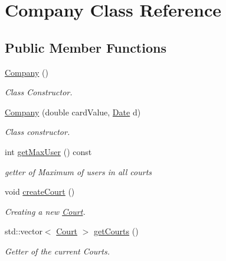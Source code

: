 \hypertarget{class_company}{}\section{Company Class Reference}
\label{class_company}
\subsection*{Public Member Functions}
\begin{DoxyCompactItemize}
\item 
\mbox{\label{class_company_a29937dda711b09df306ae7ca9b3d6b42}} 
\mbox{\hyperlink{class_company_a29937dda711b09df306ae7ca9b3d6b42}{Company}} ()
\begin{DoxyCompactList}\small\item\em Class Constructor. \end{DoxyCompactList}\item 
\mbox{\hyperlink{class_company_ac038a4c5e02f13a7bab9b5139990316e}{Company}} (double card\+Value, \mbox{\hyperlink{class_date}{Date}} d)
\begin{DoxyCompactList}\small\item\em Class constructor. \end{DoxyCompactList}\item 
int \mbox{\hyperlink{class_company_a837fd39a8f03c20a3ceb8617410956b7}{get\+Max\+User}} () const
\begin{DoxyCompactList}\small\item\em getter of Maximum of users in all courts \end{DoxyCompactList}\item 
\mbox{\label{class_company_a10770d690a59f9b4d9f84de6d0f527c9}} 
void \mbox{\hyperlink{class_company_a10770d690a59f9b4d9f84de6d0f527c9}{create\+Court}} ()
\begin{DoxyCompactList}\small\item\em Creating a new \mbox{\hyperlink{class_court}{Court}}. \end{DoxyCompactList}\item 
std\+::vector$<$ \mbox{\hyperlink{class_court}{Court}} $>$ \mbox{\hyperlink{class_company_afa0ab125a0ba718fe2c13802fe1703be}{get\+Courts}} ()
\begin{DoxyCompactList}\small\item\em Getter of the current Courts. \end{DoxyCompactList}\item 

\end{DoxyCompactItemize}
